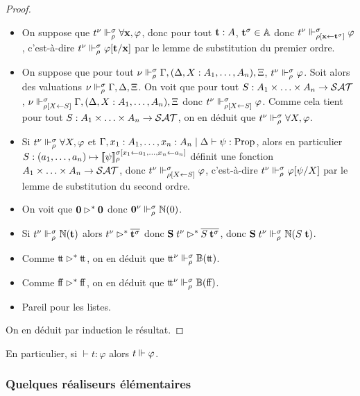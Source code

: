 \documentclass{article}
\begin{document}
\begin{proof}
\begin{itemize}
  \item On suppose que $t^\nu\Vdash_\rho^\sigma \forall \mathbf{x}, \varphi$, donc pour tout $\mathbf{t} : A$, $\mathbf{t}^\sigma \in \mathbb A$ donc $t^\nu\Vdash_{\rho[\mathbf{x}\leftarrow \mathbf{t}^\sigma]}^\sigma \varphi$, c'est-à-dire $t^\nu\Vdash_\rho^\sigma \varphi[\mathbf{t}/\mathbf{x}]$ par le lemme de substitution du premier ordre.
  \item On suppose que pour tout $\nu\Vdash_\rho^\sigma \Gamma, (\Delta, X : A_1,\ldots,A_n), \Xi$, $t^\nu \Vdash_\rho^\sigma \varphi$. Soit alors des valuations $\nu\Vdash_\rho^\sigma\Gamma, \Delta,\Xi$. On voit que pour tout $S : A_1\times\ldots\times A_n \to \mathcal {SAT}$, $\nu\Vdash_{\rho[X\leftarrow S]}^\sigma \Gamma, (\Delta, X : A_1,\ldots,A_n),\Xi$ donc $t^\nu\Vdash_{\rho[X\leftarrow S]}^\sigma \varphi$. Comme cela tient pour tout $S : A_1\times\ldots\times A_n \to \mathcal {SAT}$, on en déduit que $t^\nu\Vdash_\rho^\sigma \forall X, \varphi$.
  \item Si $t^\nu\Vdash_\rho^\sigma \forall X, \varphi$ et $\Gamma,x_1 : A_1,\ldots,x_n : A_n\mid\Delta\vdash \psi : \mathrm{Prop}$, alors en particulier $S : (a_1,\ldots,a_n) \mapsto \llbracket \psi \rrbracket_\rho^{\sigma[x_1\leftarrow a_1,\ldots, x_n \leftarrow a_n]}$ définit une fonction $A_1\times\ldots\times A_n \to\mathcal {SAT}$, donc $t^\nu\Vdash_{\rho[X\leftarrow S]}^\sigma \varphi$, c'est-à-dire $t^\nu\Vdash_\rho^\sigma \varphi[\psi/X]$ par le lemme de substitution du second ordre.
  \item On voit que $\boldsymbol 0\rhd^*\boldsymbol 0$ donc $\boldsymbol 0^\nu\Vdash_\rho^\sigma\mathbb{N}(0)$.
  \item Si $t^\nu\Vdash_\rho^\sigma \mathbb{N}(\mathbf{t})$ alors $t^\nu\rhd^*\overline{\mathbf{t}^\sigma}$ donc $\mathbf{S}\;t^\nu\rhd^* \overline{S\:\mathbf{t}^\sigma}$, donc $\mathbf{S}\;t^\nu\Vdash_\rho^\sigma \mathbb{N}(S\;\mathbf{t})$.
  \item Comme $\mathrm{t}\!\mathrm{t}\rhd^* \mathrm{t}\!\mathrm{t}$, on en déduit que $\mathrm{t}\!\mathrm{t}^\nu\Vdash_\rho^\sigma\mathbb{B}(\mathrm{t}\!\mathrm{t})$.
  \item Comme $\mathrm{f}\!\mathrm{f}\rhd^* \mathrm{f}\!\mathrm{f}$, on en déduit que $\mathrm{t}\!\mathrm{t}^\nu\Vdash_\rho^\sigma\mathbb{B}(\mathrm{f}\!\mathrm{f})$.
  \item Pareil pour les listes.
  \end{itemize}

  On en déduit par induction le résultat.
\end{proof}

En particulier, si $\vdash t : \varphi$ alors $t\Vdash \varphi$.

\subsubsection{Quelques réaliseurs élémentaires}
\end{document}
